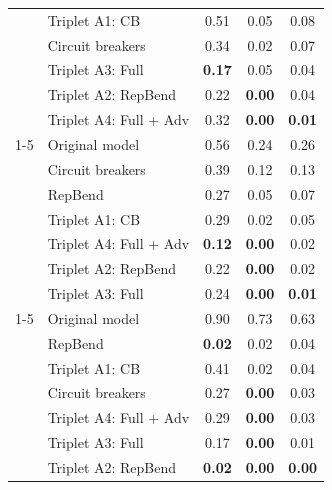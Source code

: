 \documentclass[11pt]{article}
\begin{document}
\begin{table}[tb]
{\begin{tabular}{llccc}
 & Triplet A1: CB & 0.51 & 0.05 & 0.08 \\
 & Circuit breakers & 0.34 & 0.02 & 0.07 \\
 & Triplet A3: Full & \textbf{0.17} & 0.05 & 0.04 \\
 & Triplet A2: RepBend & 0.22 & \textbf{0.00} & 0.04 \\
 & Triplet A4: Full + Adv & 0.32 & \textbf{0.00} & \textbf{0.01} \\
\cline{1-5}
\multirow[t]{7}{*}{4} & Original model & 0.56 & 0.24 & 0.26 \\
 & Circuit breakers & 0.39 & 0.12 & 0.13 \\
 & RepBend & 0.27 & 0.05 & 0.07 \\
 & Triplet A1: CB & 0.29 & 0.02 & 0.05 \\
 & Triplet A4: Full + Adv & \textbf{0.12} & \textbf{0.00} & 0.02 \\
 & Triplet A2: RepBend & 0.22 & \textbf{0.00} & 0.02 \\
 & Triplet A3: Full & 0.24 & \textbf{0.00} & \textbf{0.01} \\
\cline{1-5}
\multirow[t]{6}{*}{5} & Original model & 0.90 & 0.73 & 0.63 \\
 & RepBend & \textbf{0.02} & 0.02 & 0.04 \\
 & Triplet A1: CB & 0.41 & 0.02 & 0.04 \\
 & Circuit breakers & 0.27 & \textbf{0.00} & 0.03 \\
 & Triplet A4: Full + Adv & 0.29 & \textbf{0.00} & 0.03 \\
 & Triplet A3: Full & 0.17 & \textbf{0.00} & 0.01 \\
 & Triplet A2: RepBend & \textbf{0.02} & \textbf{0.00} & \textbf{0.00} \\
\hline
\end{tabular}
}
\end{table}
\end{document}
